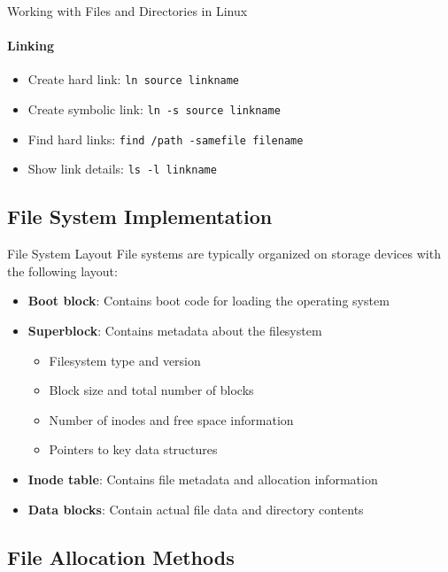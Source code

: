 \begin{KR}{Working with Files and Directories in Linux}
\begin{minipage}{0.5\linewidth}
    \paragraph{Linking}
    \begin{itemize}
        \item Create hard link: \texttt{ln source linkname}
        \item Create symbolic link: \texttt{ln -s source linkname}
        \item Find hard links: \texttt{find /path -samefile filename}
        \item Show link details: \texttt{ls -l linkname}
    \end{itemize}
    \end{minipage}
\end{KR}

\subsection{File System Implementation}

\begin{definition}{File System Layout}
    File systems are typically organized on storage devices with the following layout:
    \begin{itemize}
        \item \textbf{Boot block}: Contains boot code for loading the operating system
        \item \textbf{Superblock}: Contains metadata about the filesystem
            \begin{itemize}
                \item Filesystem type and version
                \item Block size and total number of blocks
                \item Number of inodes and free space information
                \item Pointers to key data structures
            \end{itemize}
        \item \textbf{Inode table}: Contains file metadata and allocation information
        \item \textbf{Data blocks}: Contain actual file data and directory contents
    \end{itemize}
\end{definition}

\subsection{File Allocation Methods}

